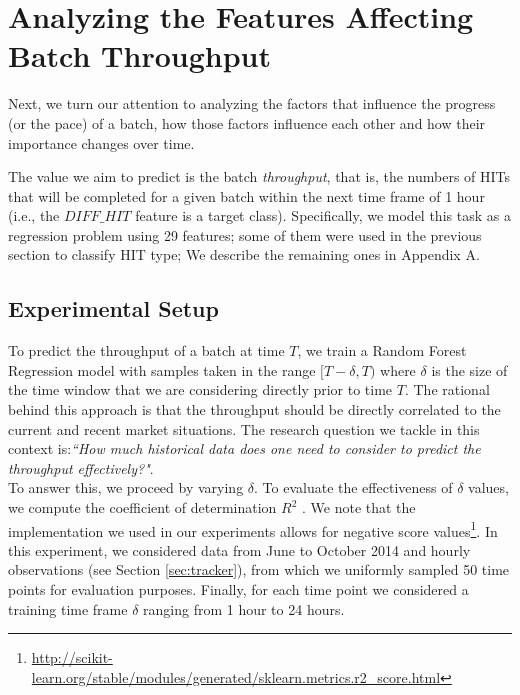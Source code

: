 \section{Analyzing the Features Affecting Batch Throughput}
\label{sec:throughput}
Next, we turn our attention to analyzing the factors that influence the progress (or the pace) of a batch, how those factors influence each other and how their importance changes over time. 

The value we aim to predict is the batch \emph{throughput}, that is, the numbers of HITs that  will be completed for a given batch within the next time frame of 1 hour (i.e.,  the $DIFF\_HIT$ feature is a target class).
Specifically, we model this task as a regression problem using 29 features; some of them were used in the previous section to classify HIT type; We describe the remaining ones in Appendix A.

\subsection{Experimental Setup}

To predict the throughput of a batch at time $T$, we train a Random Forest Regression model with samples taken in the range $[T-\delta, T)$ where $\delta$ is the size of the time window that we are   considering directly prior to time $T$. The rational behind this approach is that the throughput should be directly correlated to the current and recent market situations. 
The research question we tackle in this context is:\emph{``How much historical data does one need to consider to predict the throughput effectively?"}. \\ To answer this, we proceed by varying $\delta$.
To evaluate the effectiveness of $\delta$ values, we compute the coefficient of determination $R^2$ \cite{sklearnweb, sklearn}. We note that the implementation we used in our experiments allows for negative score values\footnote{\url{http://scikit-learn.org/stable/modules/generated/sklearn.metrics.r2_score.html}}.
In this experiment, we considered  data from June to October 2014 and hourly observations (see Section \ref{sec:tracker}), from which we uniformly sampled 50 time points for evaluation purposes. Finally, for each time point we considered a training time frame $\delta$ ranging from 1 hour to 24 hours. 

